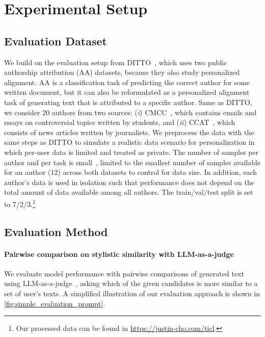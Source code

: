 \section{Experimental Setup}

\subsection{Evaluation Dataset}
\label{sec:dataset}
We build on the evaluation setup from DITTO~\cite{shaikh2024show}, which uses two public authorship attribution (AA) datasets, because they also study personalized alignment. 
AA is a classification task of predicting the correct author for some written document, but it can also be reformulated as a personalized alignment task of generating text that is attributed to a specific author.  
Same as DITTO, we consider 20 authors from two sources:
(\textit{i}) CMCC~\cite{goldstein2008cmcc}, which contains emails and essays on controversial topics written by students, and (\textit{ii}) CCAT~\cite{lewis2004ccat50}, which consists of news articles written by journalists.
We preprocess the data with the same steps as DITTO to simulate a realistic data scenario for personalization in which per-user data is limited and treated as private.  
The number of samples per author and per task is small~\cite{zhang2020improved}, limited to the smallest number of samples available for an author (12) across both datasets to control for data size. 
In addition, each author's data is used in isolation such that performance does not depend on the total amount of data available among all authors. 
The train/val/test split is set to 7/2/3.\footnote{Our processed data can be found in \url{https://justin-cho.com/ticl}.} 


 









\subsection{Evaluation Method}
\label{sec:pairwise_evaluation}

\paragraph{Pairwise comparison on stylistic similarity with LLM-as-a-judge}

We evaluate model performance with pairwise comparisons of generated text using LLM-as-a-judge~\cite{zheng2023judging, kim2023prometheus}, asking which of the given candidates is more similar to a set of user's texts. 
A simplified illustration of our evaluation approach is shown in \autoref{fig:simple_evaluation_prompt}.



